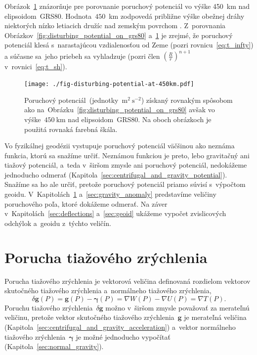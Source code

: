 \documentclass[a4paper,12pt]{book}
\let\vec\mathbf
\begin{document}
Obrázok~\ref{fig:disturbing_potential_at_450km} znázorňuje pre porovnanie 
poruchový potenciál vo výške 450~km nad elipsoidom~GRS80.  Hodnota~$450$~km 
zodpovedá približne výške obežnej dráhy niektorých nízko letiacich družíc nad 
zemským povrchom \parencite[pozri napríklad][]{MoritzPhysicalGeodesy}.  
Z~porovnania Obrázkov~\ref{fig:disturbing_potential_on_grs80} 
a~\ref{fig:disturbing_potential_at_450km} je zrejmé, že poruchový potenciál 
klesá s~narastajúcou vzdialenosťou od Zeme (pozri rovnicu~\ref{eq:t_infty}) 
a súčasne sa~jeho priebeh sa vyhladzuje (pozri člen $\left( \frac{R}{r} 
\right)^{n + 1}$ v~rovnici~\ref{eq:t_sh}).

\begin{figure}
\centering
\texttt{[image: ./fig-disturbing-potential-at-450km.pdf]}
\caption{Poruchový potenciál~(jednotky~$\mathrm{m}^2 \ \mathrm{s}^{-2}$) 
získaný rovnakým spôsobom ako 
na~Obrázku~\ref{fig:disturbing_potential_on_grs80} avšak vo výške~$450\ 
\mathrm{km}$ nad elipsoidom~GRS80.  Na oboch obrázkoch je použitá rovnaká 
farebná škála.}
\label{fig:disturbing_potential_at_450km}
\end{figure}

Vo fyzikálnej geodézii vystupuje poruchový potenciál väčšinou ako neznáma 
funkcia, ktorú sa snažíme určiť.  Neznámou funkciou je preto, lebo gravitačný 
ani tiažový potenciál, a~teda v~širšom zmysle ani poruchový potenciál, 
nedokážeme jednoducho odmerať 
(Kapitola~\ref{sec:centrifugal_and_gravity_potential}).  Snažíme sa ho ale 
určiť, pretože poruchový potenciál priamo súvisí s~výpočtom geoidu.  
V~Kapitolách~\ref{sec:gravity_disturbance} a~\ref{sec:gravity_anomaly} 
predstavíme veličiny poruchového poľa, ktoré dokážeme odmerať.  Na záver 
v~Kapitolách~\ref{sec:deflections} a~\ref{sec:geoid} ukážeme vypočet 
zvislicových odchýlok a~geoidu z~týchto veličín.





\section{Porucha tiažového zrýchlenia}
\label{sec:gravity_disturbance}

Porucha tiažového zrýchlenia je vektorová veličina definovaná rozdielom 
vektorov skutočného tiažového zrýchlenia a~normálneho tiažového zrýchlenia,
%
\begin{equation}
\label{eq:dg_vector}
\delta \vec g(P) = \vec g(P) - \boldsymbol \gamma(P) = \nabla W(P) - \nabla 
U(P) = \nabla T(P){.}
\end{equation}
%
Poruchu tiažového zrýchlenia~$\delta \vec g$ možno v~širšom zmysle považovať za 
merateľnú veličinu, pretože vektor skutočného tiažového zrýchlenia~$\vec g$ je 
merateľná veličina (Kapitola~\ref{sec:centrifugal_and_gravity_acceleration}) 
a~vektor normálneho tiažového zrýchlenia~$\boldsymbol\gamma$ je možné 
jednoducho vypočítať (Kapitola~\ref{sec:normal_gravity}).
\end{document}
